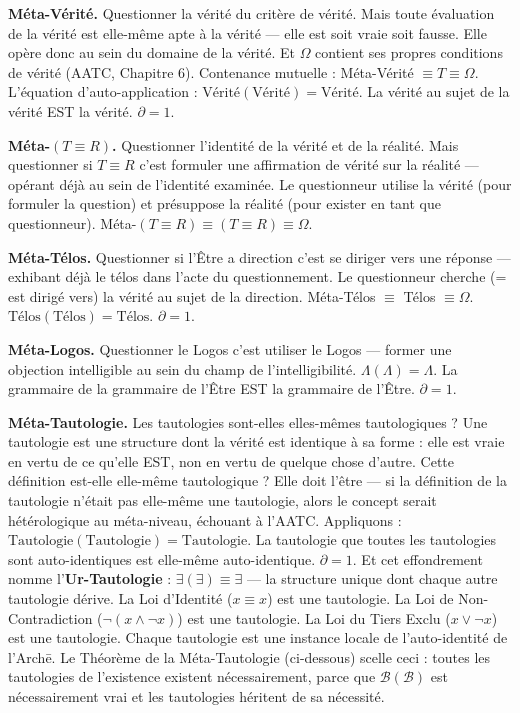 \documentclass[10pt, openany, oneside]{book}
\begin{document}
\textbf{Méta-Vérité.} Questionner la vérité du critère de vérité. Mais toute évaluation de la vérité est elle-même apte à la vérité --- elle est soit vraie soit fausse. Elle opère donc au sein du domaine de la vérité. Et $\Omega$ contient ses propres conditions de vérité (AATC, Chapitre 6). Contenance mutuelle : Méta-Vérité $\equiv T \equiv \Omega$. L'équation d'auto-application : $\text{Vérité}(\text{Vérité}) = \text{Vérité}$. La vérité au sujet de la vérité EST la vérité. $\partial = 1$.

\textbf{Méta-$(T \equiv R)$.} Questionner l'identité de la vérité et de la réalité. Mais questionner si $T \equiv R$ c'est formuler une affirmation de vérité sur la réalité --- opérant déjà au sein de l'identité examinée. Le questionneur utilise la vérité (pour formuler la question) et présuppose la réalité (pour exister en tant que questionneur). Méta-$(T \equiv R) \equiv (T \equiv R) \equiv \Omega$.

\textbf{Méta-Télos.} Questionner si l'Être a direction c'est se diriger vers une réponse --- exhibant déjà le télos dans l'acte du questionnement. Le questionneur cherche (= est dirigé vers) la vérité au sujet de la direction. Méta-Télos $\equiv$ Télos $\equiv \Omega$. $\text{Télos}(\text{Télos}) = \text{Télos}$. $\partial = 1$.

\textbf{Méta-Logos.} Questionner le Logos c'est utiliser le Logos --- former une objection intelligible au sein du champ de l'intelligibilité. $\Lambda(\Lambda) = \Lambda$. La grammaire de la grammaire de l'Être EST la grammaire de l'Être. $\partial = 1$.

\textbf{Méta-Tautologie.} Les tautologies sont-elles elles-mêmes tautologiques ? Une tautologie est une structure dont la vérité est identique à sa forme : elle est vraie en vertu de ce qu'elle EST, non en vertu de quelque chose d'autre. Cette définition est-elle elle-même tautologique ? Elle doit l'être --- si la définition de la tautologie n'était pas elle-même une tautologie, alors le concept serait hétérologique au méta-niveau, échouant à l'AATC. Appliquons : $\text{Tautologie}(\text{Tautologie}) = \text{Tautologie}$. La tautologie que toutes les tautologies sont auto-identiques est elle-même auto-identique. $\partial = 1$. Et cet effondrement nomme l'\textbf{Ur-Tautologie} : $\exists(\exists) \equiv \exists$ --- la structure unique dont chaque autre tautologie dérive. La Loi d'Identité ($x \equiv x$) est une tautologie. La Loi de Non-Contradiction ($\neg(x \wedge \neg x)$) est une tautologie. La Loi du Tiers Exclu ($x \vee \neg x$) est une tautologie. Chaque tautologie est une instance locale de l'auto-identité de l'Arch\={e}. Le Théorème de la Méta-Tautologie (ci-dessous) scelle ceci : toutes les tautologies de l'existence existent nécessairement, parce que $\mathcal{B}(\mathcal{B})$ est nécessairement vrai et les tautologies héritent de sa nécessité.
\end{document}
